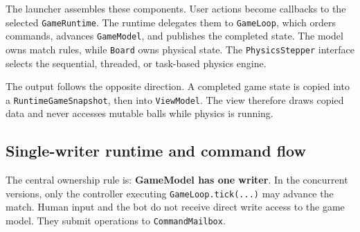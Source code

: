 \begin{center}
\end{center}

The launcher assembles these components. User actions become callbacks to the
selected \texttt{GameRuntime}. The runtime delegates them to
\texttt{GameLoop}, which orders commands, advances \texttt{GameModel}, and
publishes the completed state. The model owns match rules, while
\texttt{Board} owns physical state. The \texttt{PhysicsStepper} interface
selects the sequential, threaded, or task-based physics engine.

The output follows the opposite direction. A completed game state is copied
into a \texttt{RuntimeGameSnapshot}, then into \texttt{ViewModel}. The view
therefore draws copied data and never accesses mutable balls while physics is
running.

\subsection{Single-writer runtime and command flow}

The central ownership rule is: \textbf{GameModel has one writer}. In the
concurrent versions, only the controller executing \texttt{GameLoop.tick(...)}
may advance the match. Human input and the bot do not receive direct write
access to the game model. They submit operations to \texttt{CommandMailbox}.

